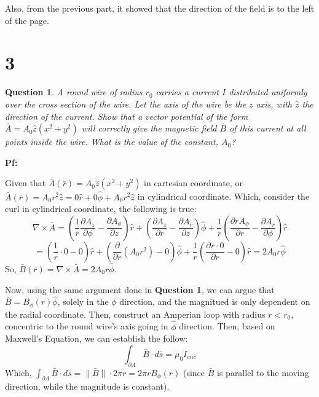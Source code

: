 \documentclass{article}
\newtheorem{question}{Question}
\begin{document}
Also, from the previous part, it showed that the direction of the field is to the left of the page.

\break

\section*{3}
\begin{myBox}[]{}
    \begin{question}
        A round wire of radius $r_0$ carries a current $I$ distributed uniformly
        over the cross section of the wire. Let the axis of the wire be the $z$
        axis, with $\hat{z}$ the direction of the current. Show that a vector potential 
        of the form $\bar{A}=A_0\hat{z}(x^2+y^2)$ will correctly give the magnetic
        field $\bar{B}$ of this current at all points inside the wire. What is the value
        of the constant, $A_0$?
    \end{question}
\end{myBox}

\textbf{Pf:}

Given that $\bar{A}(\bar{r})=A_0\hat{z}(x^2+y^2)$ in cartesian coordinate, or $\bar{A}(\bar{r})=A_0r^2\hat{z} = 0\hat{r}+0\hat{\phi}+A_0r^2\hat{z}$ in cylindrical coordinate.
Which, consider the curl in cylindrical coordinate, the following is true:
$$\nabla\times \bar{A}=\left(\frac{1}{r}\frac{\partial A_z}{\partial \phi}-\frac{\partial A_\phi}{\partial z}\right)\hat{r}+\left(\frac{\partial A_z}{\partial r}-\frac{\partial A_r}{\partial z}\right)\hat{\phi}+\frac{1}{r}\left(\frac{\partial rA_\phi}{\partial r}-\frac{\partial A_r}{\partial \phi}\right)\hat{r}$$
$$=\left(\frac{1}{r}\cdot 0-0\right)\hat{r}+\left(\frac{\partial}{\partial r}(A_0r^2)-0\right)\hat{\phi}+\frac{1}{r}\left(\frac{\partial r\cdot 0}{\partial r}-0\right)\hat{r} =2A_0r\hat{\phi}$$
So, $\bar{B}(\bar{r})=\nabla\times \bar{A}=2A_0r\hat{\phi}$.

\hfill

Now, using the same argument done in \textbf{Question 1}, we can argue that $\bar{B}=B_\phi(r)\hat{\phi}$, solely in the $\phi$ direction, and the magnitued is only dependent on the radial coordinate.
Then, construct an Amperian loop with radius $r<r_0$, concentric to the round wire's axis going in $\hat{\phi}$ direction. Then, based on Maxwell's Equation, we can establish the follow:
$$\int_{\partial A}\bar{B}\cdot d\bar{s}=\mu_0 I_{enc}$$
Which, $\int_{\partial A}\bar{B}\cdot d\bar{s}=\|\bar{B}\|\cdot 2\pi r = 2\pi rB_\phi(r)$ (since $\bar{B}$ is parallel to the moving direction, while the magnitude is constant).
\end{document}

